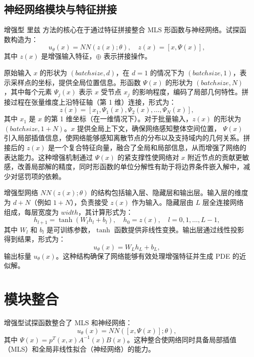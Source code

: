 \documentclass[engineeringmaster]{hquThesis}
\begin{document}
\subsection{神经网络模块与特征拼接}
增强型 里兹 方法的核心在于通过特征拼接整合 MLS 形函数与神经网络。试探函数构造为：
\begin{equation}
u_\theta(x) = NN(z(x); \theta), \quad z(x) = [x, \Psi(x)],
\end{equation}
其中 \(z(x)\) 是增强输入特征，\(\oplus\) 表示拼接操作。


原始输入 \(x\) 的形状为 \((batchsize, d)\)，在 \(d=1\) 的情况下为 \((batchsize, 1)\)，表示采样点的坐标，提供全局位置信息。形函数 \(\Psi(x)\) 的形状为 \((batchsize, N)\)，其中每个元素 \(\Psi_j(x)\) 表示 \(x\) 受节点 \(x_j\) 的影响程度，编码了局部几何特性。拼接过程在张量维度上沿特征轴（第 1 维）连接，形式为：
\begin{equation}
z(x) = [x_1, \Psi_1(x), \Psi_2(x), \dots, \Psi_N(x)],
\end{equation}
其中 \(x_1\) 是 \(x\) 的第 1 维坐标（在一维情况下）。对于批量输入，\(z(x)\) 的形状为 \((batchsize, 1 + N)\)。\(x\) 提供全局上下文，确保网络感知整体空间位置， \(\Psi(x)\) 引入局部插值信息，使网络能够感知离散节点的分布以及支持域内的几何关系。拼接后的 \(z(x)\) 是一个复合特征向量，融合了全局和局部信息，从而增强了网络的表达能力。这种增强机制通过 \(\Psi(x)\) 的紧支撑性使网络对 \(x\) 附近节点的贡献更敏感，改善局部解的精度，同时形函数的单位分解性有助于将边界条件嵌入解中，减少对惩罚项的依赖。

增强型网络 \(NN(z(x); \theta)\) 的结构包括输入层、隐藏层和输出层。输入层的维度为 \(d + N\)（例如 \(1 + N\)），负责接受 \(z(x)\) 作为输入。隐藏层由 \(L\) 层全连接网络组成，每层宽度为 \(width\)，其计算形式为：
\begin{equation}
h_{l+1} = \tanh(W_l h_l + b_l), \quad h_0 = z(x), \quad l = 0, 1, \dots, L-1,
\end{equation}
其中 \(W_l\) 和 \(b_l\) 是可训练参数，\(\tanh\) 函数提供非线性变换。输出层通过线性投影得到结果，形式为：
\begin{equation}
u_\theta(x) = W_L h_L + b_L,
\end{equation}
输出标量 \(u_\theta(x)\)。这种结构确保了网络能够有效处理增强特征并生成 PDE 的近似解。

\section{模块整合}
增强型试探函数整合了 MLS 和神经网络：
\[
u_\theta(x) = NN([x, \Psi(x)]; \theta),
\]
其中 \(\Psi(x) = p^T(x, x) A^{-1}(x) B(x)\)。这种整合使网络同时具备局部插值（MLS）和全局非线性拟合（神经网络）的能力。
\end{document}

